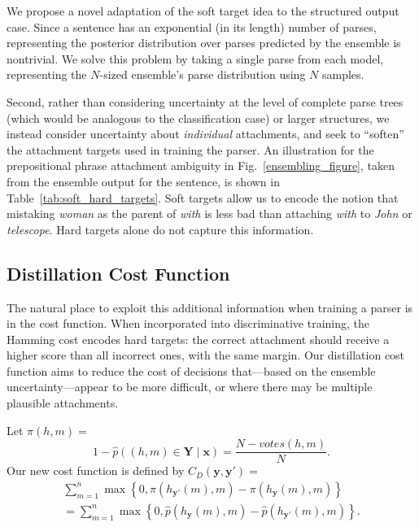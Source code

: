 \documentclass[11pt,letterpaper]{article}
\begin{document}
We propose a novel adaptation of the soft target idea to the structured output case. Since a sentence has an exponential (in its length) number of parses, representing the posterior distribution over parses predicted by the ensemble is nontrivial. We solve this problem by taking a single parse from each model, representing the $N$-sized ensemble's parse distribution using $N$ samples.

Second, rather than considering uncertainty at the level of complete parse trees (which would be analogous to the classification case) or larger structures, we instead consider uncertainty about \emph{individual} attachments, and seek to ``soften'' the attachment targets used in training the parser. An illustration for the prepositional phrase attachment ambiguity in Fig.~\ref{ensembling_figure}, taken from the ensemble output for the sentence, is shown in Table~\ref{tab:soft_hard_targets}. Soft targets allow us to encode the notion that mistaking \emph{woman} as the parent of \emph{with} is less bad than attaching \emph{with} to \emph{John} or \emph{telescope}.  Hard targets alone do not capture this information.



\subsection{Distillation Cost Function} \label{sec:distillation-cost}

The natural place to exploit this additional information when training a parser is in the cost function. When incorporated into discriminative training, the Hamming cost encodes hard targets:  the correct attachment should receive
a higher score than all incorrect ones, with the same margin.  Our distillation cost function aims to reduce the cost of decisions
that---based on the ensemble uncertainty---appear to be more difficult, or where there may be multiple plausible attachments.

Let $\pi(h, m) = $
\begin{equation*}
  1 - \hat{p}((h, m) \in \boldsymbol{Y} \mid \boldsymbol{x}) =  \frac{N- \mathit{votes}(h, m)}{N}.
\end{equation*}
Our new cost function is defined by $C_D(\boldsymbol{y}, \boldsymbol{y'}) =$
\begin{align}
\textstyle \sum_{m=1}^n \max \left\{ 0, \pi(h_{\boldsymbol{y'}}(m), m) - \pi(h_{\boldsymbol{y}}(m), m) \right\} \nonumber \\
= \textstyle \sum_{m=1}^n \max \left\{0, \hat{p}(h_{\boldsymbol{y}}(m),m) - \hat{p}(h_{\boldsymbol{y'}}(m),m) \right\}. \label{eq3} 
\end{align}
\end{document}
